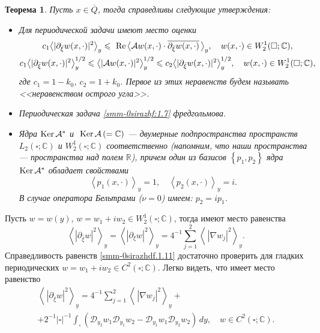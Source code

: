 \documentclass[a4paper,12pt]{article}
\newtheorem{theorem}{Теорема}[section]
\theoremstyle{definition}
\begin{document}
\begin{theorem}\label{smm2-th3}  Пусть $x\in\overline Q$, тогда справедливы следующие утверждения:
\begin{itemize}
	\item  {Для периодической задачи имеют место оценки}
	\begin{gather}\label{smm-0sirazhf:1.9}
		c_1\big<|\partial_{\bar{\xi}}w(x,\cdot)|^2\big>_y\leqslant \text{ Re\,}\big<\mathcal{A}w(x,\cdot)\cdot \overline{\partial_{\bar{\xi}}w(x,\cdot)}\,\big>_y,\quad  w(x,\cdot)\in W_2^1(\square;\mathbb{C}),\\
		c_1\big<|\partial_{\bar{\xi}}w(x,\cdot)|^2\big>_y^{1/2}\leqslant
		\big<|\mathcal{A}w(x,\cdot)|^2\big>_y^{1/2}\leqslant c_2\big<|\partial_{\bar{\xi}}w(x,\cdot)|^2\big>_y^{1/2},\quad  w(x,\cdot)\in W_2^1(\square;\mathbb{C}),\label{smm-0sirazhf:1.9'}
	\end{gather}
	{ где $c_1=1-k_0$, $c_2=1+k_0$. Первое из этих неравенств будем называть <<неравенством острого угла>>}.
	\item { Периодическая задача \eqref{smm-0sirazhf:1.7} фредгольмова.}
	\item {Ядра  $\text{Ker\,}\mathcal{A}^\ast$ и $\text{ Ker\,}\mathcal{A}\,(=\mathbb{C})$
		--- двумерные подпространства пространств $L_2(\square;\mathbb{C})$ и $W_2^1(\square;\mathbb{C})$ соответственно {\rm(}напомним, что
		наши пространства --- пространства над полем $\mathbb{R}${\rm)},
		причем один из базисов $\left\{p_1,p_2\right\}$ ядра
		$\text{Ker\,}\mathcal{A}^\ast$ обладает свойствами
		\begin{equation}\label{smm-0sirazhdf:1.10}
			\left< p_1(x,\cdot)\right>_y=1,\quad \left< p_2(x,\cdot)\right>_y=i.
		\end{equation}
		В случае оператора Бельтрами {\rm(}$\nu=0${\rm)} имеем: $p_2=ip_1$.}
\end{itemize}
\end{theorem}
Пусть $w=w(y)$, $w=w_1+iw_2\in W_2^1(\square;\mathbb{C})$, тогда имеют место равенства
\begin{equation}\label{smm-0sirazhdf.1.11}
	\left<|\partial_{\bar{\xi}}w|^2\right>_y=\left<|\partial_{\xi}w|^2\right>_y=4^{-1}\sum_{j=1}^2\left<
	\,|\nabla w_j|^2\right>_y.
\end{equation}
Справедливость равенств \eqref{smm-0sirazhdf.1.11} достаточно проверить  для  гладких периодических $w=w_1+iw_2\in C^2(\square;\mathbb{C})$. Легко видеть, что имеет место равенство
\begin{equation}\label{smm-0sirazhdf.1.111}
	\begin{gathered}
		\left<\,|\partial_{\bar \xi} w|^2\right>_y=4^{-1}\sum_{j=1}^2\left<
		\,|\nabla w_j|^2\right>_y+\\
		+2^{-1}|\square|^{-1}\int_{\square}\left(\mathscr{D}_{y_2}w_1\mathscr{D}_{y_1}w_2-\mathscr{D}_{y_1}w_1\mathscr{D}_{y_2}w_2\right)\,dy,\quad w\in C^2(\square;\mathbb{C}).
	\end{gathered}
\end{equation}
\end{document}
